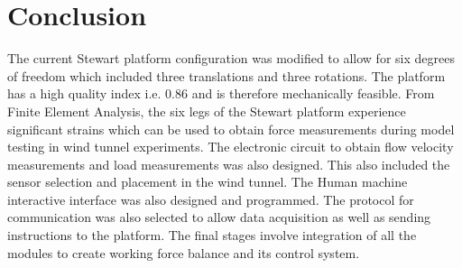 \section{Conclusion}
The current Stewart platform configuration was modified to allow for six degrees of freedom which included three translations and three rotations.
The platform has a high quality index i.e. 0.86 and is therefore mechanically feasible. From Finite Element Analysis, the six legs of the Stewart platform experience significant strains which can be used to obtain force measurements during model testing in wind tunnel experiments.
The electronic circuit to obtain flow velocity measurements and load measurements was also designed. This also included the sensor selection and placement in the wind tunnel. 
The Human machine interactive interface was also designed and programmed. The protocol for communication was also selected to allow data acquisition as well as sending instructions to the platform. 
The final stages involve integration of all the modules to create working force balance and its control system.